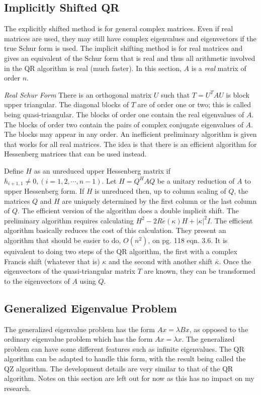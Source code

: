 \documentclass[12pt,twoside]{article}
\newcommand{\evalsl}{eigenvalues}
\newcommand{\eval}{eigenvalue }
\newcommand{\evals}{eigenvalues }
\newcommand{\evecs}{eigenvectors }
\begin{document}
\subsection{Implicitly Shifted QR}
The explicitly shifted method is for general complex matrices. Even if real matrices are used, they may still have complex \evals and \evecs if the true Schur form is used. The implicit shifting method is for real matrices and gives an equivalent of the Schur form that is real and thus all arithmetic involved in the QR algorithm is real (much faster). In this section, $A$ is a \emph{real} matrix of order $n$. 

\emph{Real Schur Form}
There is an orthogonal matrix $U$ such that $T=U^TAU$ is block upper triangular. The diagonal blocks of $T$ are of order one or two; this is called being quasi-triangular. The blocks of order one contain the real \evals of $A$. The blocks of order two contain the pairs of complex conjugate \evals of $A$. The blocks may appear in any order. An inefficient preliminary algorithm is given that works for all real matrices. The idea is that there is an efficient algorithm for Hessenberg matrices that can be used instead. 

Define $H$ as an unreduced upper Hessenberg matrix if $h_{i+1,1} \ne 0, (i = 1, 2, \cdots, n-1)$. Let $H = Q^HAQ$ be a unitary reduction of $A$ to upper Hessenberg form. If $H$ is unreduced then, up to column scaling of $Q$, the matrices $Q$ and $H$ are uniquely determined by the first column or the last column of $Q$. 
The efficient version of the algorithm does a double implicit shift. The preliminary algorithm requires calculating $H^{2} - 2Re(\kappa)H + |\kappa|^{2}I$. The efficient algorithm basically reduces the cost of this calculation. They present an algorithm that should be easier to do, $O(n^{2})$, on pg. 118 eqn. 3.6. It is equivalent to doing two steps of the QR algorithm, the first with a complex Francis shift (whatever that is) $\kappa$ and the second with another shift $\bar{\kappa}$. Once the \evecs of the quasi-triangular matrix $T$ are known, they can be transformed to the \evecs of $A$ using $Q$. 

\subsection{Generalized Eigenvalue Problem}
The generalized \eval problem has the form $Ax = \lambda Bx$, as opposed to the ordinary \eval problem which has the form $Ax = \lambda x$. The generalized problem can have some different features such as infinite \evalsl. The QR algorithm can be adapted to handle this form, with the result being called the QZ algorithm. The development details are very similar to that of the QR algorithm. Notes on this section are left out for now as this has no impact on my research. 
\end{document}
